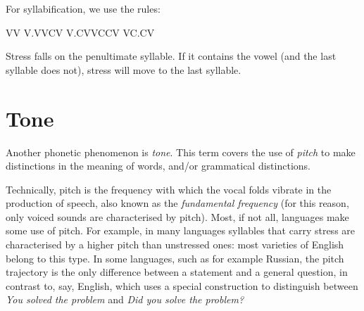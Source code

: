 \begin{refsection}
\begin{mysolution}
\begin{solutions}
\begin{itemize}[leftmargin = 1em]
    \begin{multicols}{4}
        \item[] 
        \item[] 
        \item[] 
        \item[] 
        \item[] 
        \item[] 
        \item[] 
        \item[] 
    \end{multicols}
    \end{itemize}
    \item For syllabification, we use the rules:
    \item[] \quad\quad VV \textrightarrow{} V.V\hfill VCV \textrightarrow{} V.CV\hfill VCCV \textrightarrow{} VC.CV
    \item[] Stress falls on the penultimate syllable. If it contains the vowel  (and the last syllable does not), stress will move to the last syllable.
\end{solutions}
\end{mysolution}

\section{Tone}\label{sec:3.6}\largerpage

Another phonetic phenomenon is \emph{tone}. This term covers the use of \emph{pitch} to make distinctions in the meaning of words, and/or grammatical distinctions.

Technically, pitch is the frequency with which the vocal folds vibrate in the production of speech, also known as the \emph{fundamental frequency} (for this reason, only voiced sounds are characterised by pitch). Most, if not all, languages make some use of pitch. For example, in many languages syllables that carry stress are characterised by a higher pitch than unstressed ones: most varieties of English belong to this type. In some languages, such as for example Russian, the pitch trajectory is the only difference between a statement and a general question, in contrast to, say, English, which uses a special construction to distinguish between \textit{You solved the problem} and \textit{Did you solve the problem?}


\end{refsection}
